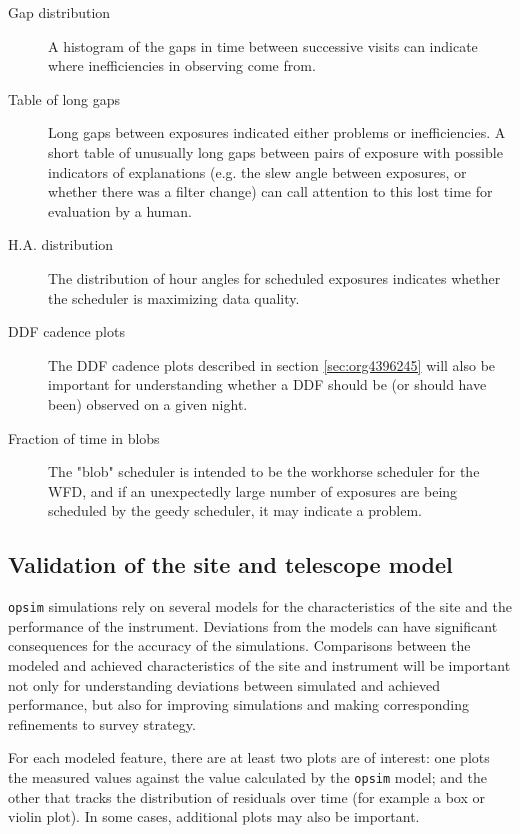 \begin{description}
\item[{Gap distribution}] A histogram of the gaps in time between successive visits can indicate where inefficiencies in observing come from.
\item[{Table of long gaps}] Long gaps between exposures indicated either problems or inefficiencies. A short table of unusually long gaps between pairs of exposure with possible indicators of explanations (e.g. the slew angle between exposures, or whether there was a filter change) can call attention to this lost time for evaluation by a human.
\item[{H.A. distribution}] The distribution of hour angles for scheduled exposures indicates whether the scheduler is maximizing data quality.
\item[{DDF cadence plots}] The DDF cadence plots described in section \ref{sec:org4396245} will also be important for understanding whether a DDF should be (or should have been) observed on a given night.
\item[{Fraction of time in blobs}] The "blob" scheduler is intended to be the workhorse scheduler for the WFD, and if an unexpectedly large number of exposures are being scheduled by the geedy scheduler, it may indicate a problem.
\end{description}

\subsection{Validation of the site and telescope model}
\label{sec:org51fa723}
\texttt{opsim} simulations rely on several models for the characteristics of the site and the performance of the instrument.
Deviations from the models can have significant consequences for the accuracy of the simulations.
Comparisons between the modeled and achieved characteristics of the site and instrument will be important not only for understanding deviations between simulated and achieved performance, but also for improving simulations and making corresponding refinements to survey strategy.

For each modeled feature, there are at least two plots are of interest: one plots the measured values against the value calculated by the \texttt{opsim} model; and the other that tracks the distribution of residuals over time (for example a box or violin plot).
In some cases, additional plots may also be important.

